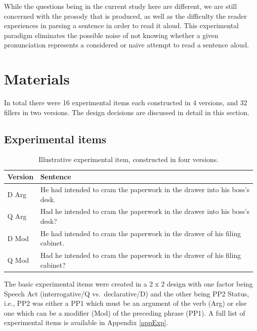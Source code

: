 \documentclass[12pt,oneside]{book}
\begin{document}
While the questions being in the current study here are different, we are still concerned with the prosody that is produced, as well as the difficulty the reader experiences in parsing a sentence in order to read it aloud. This experimental paradigm eliminates the possible noise of not knowing whether a given pronunciation represents a considered or naive attempt to read a sentence aloud.

\hypertarget{mat}{%
\section{Materials}\label{mat}}

In total there were 16 experimental items each constructed in 4 versions, and 32 fillers in two versions. The design decisions are discussed in detail in this section.

\hypertarget{experimental-items}{%
\subsection{Experimental items}\label{experimental-items}}

\begin{table}[H]

\caption{\label{tab:sentences}Illustrative experimental item, constructed in four versions.}
\centering
\begin{tabular}{ll}
\toprule
Version & Sentence\\
\midrule
D Arg & He had intended to cram the paperwork in the drawer into his boss's desk.\\
Q Arg & Had he intended to cram the paperwork in the drawer into his boss's desk?\\
D Mod & He had intended to cram the paperwork in the drawer of his filing cabinet.\\
Q Mod & Had he intended to cram the paperwork in the drawer of his filing cabinet?\\
\bottomrule
\end{tabular}
\end{table}

The basic experimental items were created in a 2 x 2 design with one factor being Speech Act (interrogative/Q vs.~declarative/D) and the other being PP2 Status, i.e., PP2 was either a PP1 which must be an argument of the verb (Arg) or else one which can be a modifier (Mod) of the preceding phrase (PP1). A full list of experimental items is available in Appendix \ref{appExp}.
\end{document}
